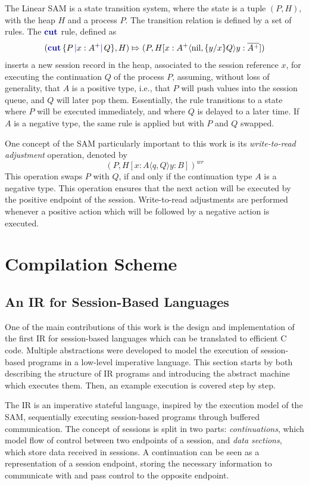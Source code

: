 \documentclass[sigconf,nonacm,natbib=true]{acmart}
\begin{document}
The Linear \ac{SAM} is a state transition system, where the state is a tuple $(P, H)$, with the heap $H$ and a process $P$. The transition relation is defined by a set of rules. The $\cutp$ rule, defined as
\[
    (\cutc{P}{x: A^+}{Q}, H)
    \Mapsto
    (P, H[x: A^+\langle\text{nil},\{y/x\}Q\rangle y:\dual{A^+}])
\]
inserts a new session record in the heap, associated to the session reference $x$, for executing the continuation $Q$ of the process $P$, assuming, without loss of generality, that $A$ is a positive type, i.e., that $P$ will push values into the session queue, and $Q$ will later pop them. Essentially, the rule transitions to a state where $P$ will be executed immediately, and where $Q$ is delayed to a later time. If $A$ is a negative type, the same rule is applied but with $P$ and $Q$ swapped.

One concept of the \ac{SAM} particularly important to this work is its \textit{write-to-read adjustment} operation, denoted by \[(P,H[x:A\langle q,Q\rangle y:B])^{wr}\] This operation swaps $P$ with $Q$, if and only if the continuation type $A$ is a negative type. This operation ensures that the next action will be executed by the positive endpoint of the session. Write-to-read adjustments are performed whenever a positive action which will be followed by a negative action is executed.

\section{Compilation Scheme}

\subsection{An IR for Session-Based Languages}

One of the main contributions of this work is the design and implementation of the first \acf{IR} for session-based languages which can be translated to efficient C code. Multiple abstractions were developed to model the execution of session-based programs in a low-level imperative language. This section starts by both describing the structure of \ac{IR} programs and introducing the abstract machine which executes them. Then, an example execution is covered step by step.

The \ac{IR} is an imperative stateful language, inspired by the execution model of the \ac{SAM}, sequentially executing session-based programs through buffered communication. The concept of sessions is split in two parts: \textit{continuations}, which model flow of control between two endpoints of a session, and \textit{data sections}, which store data received in sessions. A continuation can be seen as a representation of a session endpoint, storing the necessary information to communicate with and pass control to the opposite endpoint.
\end{document}
